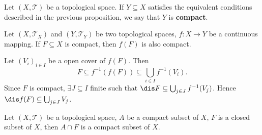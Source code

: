 \begin{definitionenv}
    Let $(X,\mathscr{T})$ be a topological space. If $Y\subseteq X$ satisfies the equivalent conditions described in the previous proposition, we say that $Y$ is \textbf{compact}.
\end{definitionenv}
\begin{propositionenv}
    Let $(X,\mathscr{T}_X)$ and $(Y,\mathscr{T}_Y)$ be two topological spaces, $f:X\longrightarrow Y$ be a continuous mapping. If $F\subseteq X$ is compact, then $f(F)$ is also compact.
\end{propositionenv}
\begin{proofenv}
    Let $(V_i)_{i\in I}$ be a open cover of $f(F)$. Then 
    $$F\subseteq f^{-1}\left(f(F)\right)\subseteq \bigcup_{i\in I}f^{-1}(V_i).$$
    Since $F$ is compact, $\exists J\subseteq I$ finite such that $\dis F\subseteq \bigcup_{j\in J}f^{-1}(V_j)$. Hence $\dis f(F)\subseteq\bigcup_{j\in J}V_j$.
\end{proofenv}
\begin{propositionenv}\label{8.8.9}
    Let $\left(X,\mathscr{T}\right)$ be a topological space, $A$ be a compact subset of $X$, $F$ is a closed subset of $X$, then $A\cap F$ is a compact subset of $X$.
\end{propositionenv}
